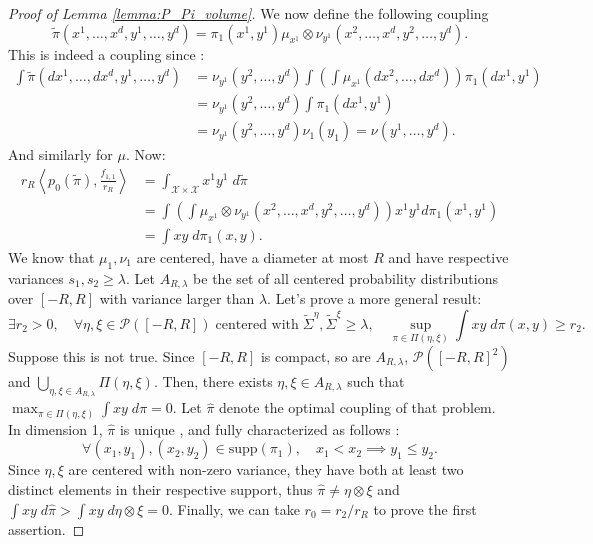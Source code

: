 \documentclass{article}
\newcommand{\X}{\mathcal{X}}
\newcommand{\1}{\mathbf{1}}
\renewcommand{\P}{\mathcal{P}}
\theoremstyle{definition}
\theoremstyle{remark}
\begin{document}
\begin{appendices}
\begin{proof}[Proof of Lemma \ref{lemma:P_Pi_volume}]
    We now define the following coupling  \[\tilde{\pi}(x^1,\dots,x^d,y^1,\dots,y^d) = \pi_1(x^1,y^1) \mu_{x^1}\otimes\nu_{y^1}(x^2,\dots,x^d,y^2,\dots,y^d).\] This is indeed a coupling since :
    \begin{equation*}
        \begin{split}
            \int\tilde{\pi}(dx^1,\dots,dx^d,y^1,\dots,y^d)&=\nu_{y^1}(y^2,\dots,y^d)\int\left(\int \mu_{x^1}(dx^2,\dots,dx^d)\right)\pi_1(dx^1,y^1)\\
            &=\nu_{y^1}(y^2,\dots,y^d)\int \pi_1(dx^1,y^1)\\
            &=\nu_{y^1}(y^2,\dots,y^d)\nu_1(y_1)=\nu(y^1,\dots,y^d).
        \end{split}
    \end{equation*}
    And similarly for $\mu$. Now:
    \begin{align*}
        r_R\left\langle p_0(\tilde{\pi}), \frac{f_{1,1}}{r_R}\right\rangle&=\int_{\X\times\X} x^1y^1\;d\tilde{\pi}\\&=\int \left(\int \mu_{x^1}\otimes\nu_{y^1}(x^2,\dots,x^d,y^2,\dots,y^d)\right) x^1y^1d\pi_1(x^1,y^1)\\&=\int  xy\;d\pi_1(x,y).
    \end{align*}
    We know that $\mu_1,\nu_1$ are centered, have a diameter at most $R$ and have respective variances $s_1,s_2\geq \lambda$. Let $A_{R,\lambda}$ be the set of all centered probability distributions over $[-R,R]$ with variance larger than $\lambda$. Let's prove a more general result:
    \[\exists r_2>0,\quad\forall\eta,\xi\in \P([-R,R]) \;\textrm{centered with}\; \tilde{\Sigma}^\eta, \tilde{\Sigma}^\xi\geq \lambda,\quad \sup_{\pi\in\Pi(\eta,\xi)}\int  xy\;d\pi(x,y)\geq r_2.\]
    Suppose this is not true. Since $[-R,R]$ is compact, so are $A_{R,\lambda}$, $\P([-R,R]^2)$ and $\bigcup_{\eta,\xi\in A_{R,\lambda}} \Pi(\eta,\xi)$.
    Then, there exists $\eta,\xi\in A_{R,\lambda} $ such that $\max_{\pi\in\Pi(\eta,\xi)}\int xy\;d\pi = 0.$
    Let $\hat{\pi}$ denote the optimal coupling of that problem. In dimension 1, $\hat{\pi}$ is unique \cite[Theorem 2.9]{santambrogio2015optimal}, and fully characterized as follows \cite[Lemma 2.8]{santambrogio2015optimal}: \[\forall (x_1,y_1),(x_2,y_2)\in \mathrm{supp}(\pi_1), \quad x_1<x_2\implies y_1\leq y_2.\] 
    Since $\eta,\xi$ are centered with non-zero variance, they have both at least two distinct elements in their respective support, thus $\hat{\pi}\neq \eta\otimes\xi$ and $\int xy\;d\hat{\pi}>\int xy\;d\eta\otimes\xi=0$. Finally, we can take $r_0=r_2/r_R$ to prove the first assertion. 
    

\end{proof}
\end{appendices}
\end{document}

